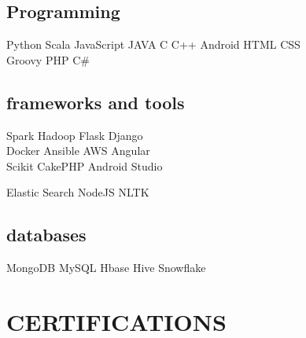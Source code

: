 \documentclass[]{deedy-resume-openfont}
\begin{document}
\begin{minipage}[t]{0.33\textwidth}
\subsection{Programming}
Python \textbullet{} Scala \textbullet{} JavaScript \textbullet{} JAVA \textbullet{} C \textbullet{} C++ \textbullet{} Android \textbullet{} HTML \textbullet{} CSS \\
\vspace{1mm}
Groovy \textbullet{} PHP \textbullet{} C\#
\sectionsep

\subsection{frameworks and tools}

Spark \textbullet{} Hadoop \textbullet{}
Flask \textbullet{} Django \textbullet{} \\ Docker \textbullet{} Ansible  \textbullet{} AWS \textbullet{} Angular \textbullet{} \\ Scikit \textbullet{} CakePHP
\textbullet{} Android Studio

\vspace{1mm}

 \textbullet{} Elastic Search \textbullet{} NodeJS \textbullet{} NLTK

\sectionsep

\subsection{databases}
MongoDB \textbullet{} MySQL \textbullet{} Hbase \textbullet{} Hive \textbullet{} Snowflake
\sectionsep


\section{CERTIFICATIONS}

\vspace{1mm}
\vspace{1mm}
\vspace{1mm}
\vspace{1mm}

%
%

\end{minipage}
\end{document}
